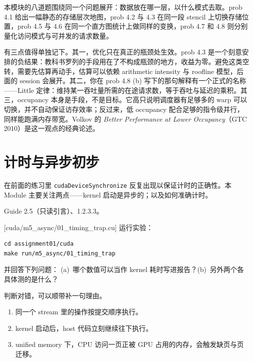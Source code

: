 \documentclass[11pt,a4paper,fontset=none]{ctexart}
\begin{document}
\begin{lookback}
本模块的八道题围绕同一个问题展开：数据放在哪一层，以什么模式去取。prob 4.1 给出一幅静态的存储层次地图，prob 4.2 与 4.3 在同一段 stencil 上切换存储位置，prob 4.5 与 4.6 在同一个直方图统计上做同样的变换，prob 4.7 和 4.8 则分别量化访问模式与可并发的请求数量。

有三点值得单独记下。其一，优化只在真正的瓶颈处生效。prob 4.3 是一个刻意安排的负结果：教科书罗列的手段用在了不构成瓶颈的地方，收益为零。避免这类空转，需要先估算再动手，估算可以依赖 arithmetic intensity 与 roofline 模型，后面的 session 会展开。其二，你在 prob 4.8 (b) 写下的那句解释有一个正式的名称——Little 定律：维持某一吞吐量所需的在途请求数，等于吞吐与延迟的乘积。其三，occupancy 本身是手段，不是目标。它高只说明调度器有足够多的 warp 可以切换，并不自动保证访存效率；反过来，低 occupancy 配合足够的指令级并行，同样能跑满内存带宽。Volkov 的 \textit{Better Performance at Lower Occupancy}（GTC 2010）是这一观点的经典论述。
\end{lookback}

\section{计时与异步初步}

在前面的练习里 \texttt{cudaDeviceSynchronize} 反复出现以保证计时的正确性。本 Module 主要关注两点——kernel 启动是异步的；以及如何准确计时。

\begin{reading}
Guide 2.5（只读引言）、1.2.3.3。
\end{reading}

[cuda/m5\_async/01\_timing\_trap.cu]
运行实验：

\begin{lstlisting}
cd assignment01/cuda
make run/m5_async/01_timing_trap
\end{lstlisting}

并回答下列问题：
(a)~哪个数值可以当作 kernel 耗时写进报告？(b)~另外两个各具体测的是什么？



判断对错，可以顺带补一句理由。
\begin{enumerate}[label=(\alph*)]
  \item 同一个 stream 里的操作按提交顺序执行。
  \item kernel 启动后，host 代码立刻继续往下执行。
  \item unified memory 下，CPU 访问一页正被 GPU 占用的内存，会触发缺页与页迁移。
\end{enumerate}
\end{document}
